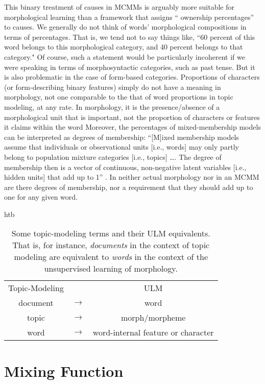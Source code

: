 This binary treatment of causes in MCMMs is arguably more suitable for morphological learning than a framework that assigns `` ownership percentages'' to causes.  We generally do not think of words' morphological compositions in terms of percentages.  That is, we tend not to say things like, ``60 percent of this word belongs to this morphological category, and 40 percent belongs to that category." Of course, such a statement would be particularly incoherent if we were speaking in terms of morphosyntactic categories, such as past tense. But it is also problematic in the case of form-based categories. Proportions of characters (or form-describing binary features) simply do not have a meaning in morphology, not one comparable to the that of word proportions in topic modeling, at any rate. In morphology, it is the presence/absence of a morphological unit that is important, not the proportion of characters or features it claims within the word
Moreover, the percentages of mixed-membership models can be interpreted as degrees of membership:  
``[M]ixed membership models assume that individuals or observational units [i.e., words] may only partly belong to population mixture categories [i.e., topics] \dots. The degree of membership then is a vector of continuous, non-negative latent variables [i.e., hidden units] that add up to 1'' \citep[][p. 4]{airoldi-et-al:2014}. In neither actual morphology nor in an MCMM are there degrees of membership, nor a requirement that they should add up to one for any given word. 

\begin{table}{htb}
\centering
\begin{tabular}{ccc}
Topic-Modeling & & ULM \\
document & $\to$ & word \\ %
topic & $\to$ & morph/morpheme \\
word & $\to$ & word-internal feature or character \\
\end{tabular}
\caption{Some topic-modeling terms and their ULM equivalents. That is, for instance, \emph{documents}
in the context of topic modeling are equivalent to \emph{words} in the context of the unsupervised learning
of morphology.}
\label{tab:tm-to-ulm}
\end{table}	

				
\section{Mixing Function}
\label{sec:mixing-function}

